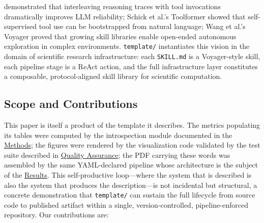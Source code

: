 \documentclass[
  english,
]{article}
\begin{document}
\begin{enumerate}
  demonstrated that interleaving reasoning traces with tool invocations
  dramatically improves LLM reliability; Schick et al.'s Toolformer
  \citep{schick2023toolformer} showed that self-supervised tool use can
  be bootstrapped from natural language; Wang et al.'s Voyager
  \citep{wang2023voyager} proved that growing skill libraries enable
  open-ended autonomous exploration in complex environments.
  \texttt{template/} instantiates this vision in the domain of
  scientific research infrastructure: each \texttt{SKILL.md} is a
  Voyager-style skill, each pipeline stage is a ReAct action, and the
  full infrastructure layer constitutes a composable, protocol-aligned
  skill library for scientific computation.
\end{enumerate}

\subsection{Scope and Contributions}\label{scope-and-contributions}

This paper is itself a product of the template it describes. The metrics
populating its tables were computed by the introspection module
documented in the \href{03a_architecture.md\#methods}{Methods}; the
figures were rendered by the visualization code validated by the test
suite described in \href{03e_quality.md\#quality-assurance}{Quality
Assurance}; the PDF carrying these words was assembled by the same
YAML-declared pipeline whose architecture is the subject of the
\href{04_results.md\#results}{Results}. This self-productive
loop---where the system that is described is also the system that
produces the description---is not incidental but structural, a concrete
demonstration that \texttt{template/} can sustain the full lifecycle
from source code to published artifact within a single,
version-controlled, pipeline-enforced repository. Our contributions are:
\end{document}
